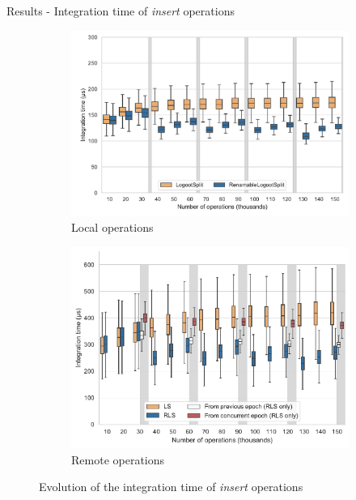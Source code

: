 \begin{frame}{Results - Integration time of \emph{insert} operations}
  \begin{figure}
    \captionsetup[subfigure]{aboveskip=-1pt,belowskip=-1pt}
    \centering
    \begin{subfigure}{0.47\columnwidth}
        \includegraphics[width=1\textwidth]{img/integration-time-boxplot-local-operations-without-outliers.pdf}
        \caption{Local operations}
        \label{fig:evolution-integration-time-local-insert-remove}
    \end{subfigure}
    \begin{subfigure}{0.47\columnwidth}
        \includegraphics[width=1\textwidth]{img/integration-time-boxplot-remote-operations-without-outliers.pdf}
        \caption{Remote operations}
        \label{fig:evolution-integration-time-remote-insert-remove}
    \end{subfigure}
    \caption{Evolution of the integration time of \emph{insert} operations}
    \label{fig:evolution-integration-time-insert-remove}
  \end{figure}


\end{frame}
